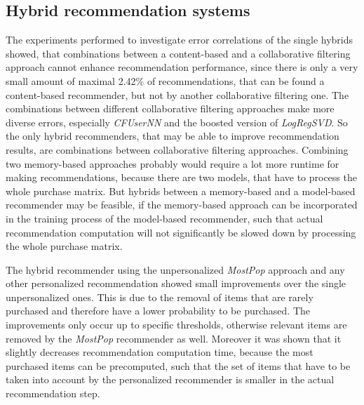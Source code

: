 \documentclass[10pt]{reportMaster}
\begin{document}
\subsection{Hybrid recommendation systems}
\label{sec:discHybrid}
The experiments performed to investigate error correlations of the single hybrids showed, that combinations between a content-based and a collaborative filtering approach cannot enhance recommendation performance, since there is only a very small amount of maximal 2.42\% of recommendations, that can be found a content-based recommender, but not by another collaborative filtering one.
The combinations between different collaborative filtering approaches make more diverse errors, especially \textit{CFUserNN} and the boosted version of \textit{LogRegSVD}.
So the only hybrid recommenders, that may be able to improve recommendation results, are combinations between collaborative filtering  approaches.
Combining two memory-based approaches probably would require a lot more runtime for making recommendations, because there are two models, that have to process the whole purchase matrix.
But hybrids between a memory-based and a model-based recommender may be feasible, if the memory-based approach can be incorporated in the training process of the model-based recommender, such that actual recommendation computation will not significantly be slowed down by processing the whole purchase matrix. %

The hybrid recommender using the unpersonalized \textit{MostPop} approach and any other personalized recommendation showed small improvements over the single unpersonalized ones.
This is due to the removal of items that are rarely purchased and therefore have a lower probability to be purchased.
The improvements only occur up to specific thresholds, otherwise relevant items are removed by the \textit{MostPop} recommender as well.
Moreover it was shown that it slightly decreases recommendation computation time, because the most purchased items can be precomputed, such that the set of items that have to be taken into account by the personalized recommender is smaller in the actual recommendation step.




\end{document}
